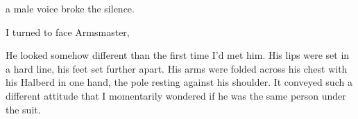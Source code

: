  a male voice broke the silence.

I turned to face Armsmaster, 

He looked somehow different than the first time I'd met him. His lips were set in a hard line, his feet set further apart. His arms were folded across his chest with his Halberd in one hand, the pole resting against his shoulder. It conveyed such a different attitude that I momentarily wondered if he was the same person under the suit.




